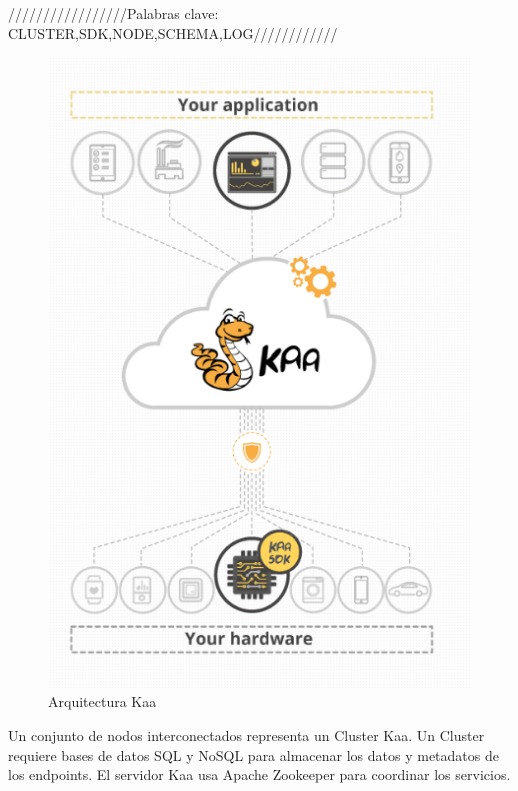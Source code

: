\documentclass[12pt, twoside]{book}
\begin{document}
/////////////////Palabras clave: CLUSTER,SDK,NODE,SCHEMA,LOG////////////
\begin{figure}[H]
\centering
\includegraphics[scale=0.5]{images/kaa_platform}
\caption{Arquitectura Kaa}\label{L501}
\end{figure}
Un conjunto de nodos interconectados representa un Cluster Kaa. Un Cluster requiere bases de datos SQL y NoSQL para almacenar los datos y metadatos de los endpoints. El servidor Kaa usa Apache Zookeeper para coordinar los servicios.
\end{document}
